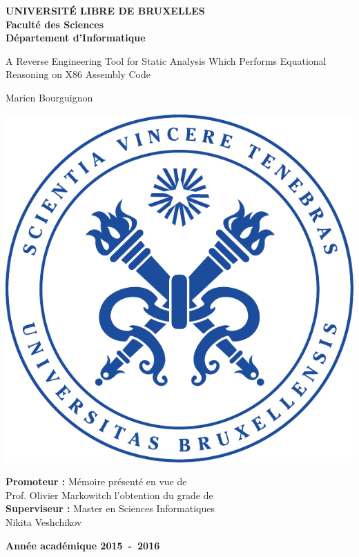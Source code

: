 \frontmatter
\begin{titlepage}
\begin{center}
	\textbf{UNIVERSIT\'E LIBRE DE BRUXELLES}\\
	\textbf{Facult\'e des Sciences}\\
	\textbf{D\'epartement d'Informatique}
	\vfill{}\vfill{}

	{\Huge   A Reverse Engineering Tool for Static Analysis Which Performs Equational Reasoning on X86 Assembly Code}

	{\Huge \par}
	\begin{center}{\LARGE Marien Bourguignon}\end{center}{\Huge \par}
	\vfill{}
	\includegraphics[keepaspectratio=true,scale=1]{ulb.pdf}
	\vfill{}
	\begin{flushright}
	{\large \textbf{Promoteur :}} \hfill{}{\large M\'emoire pr\'esent\'e en vue de}\\
	{\large Prof. Olivier Markowitch} \hfill{}{\large l'obtention du grade de}\\
	{\large \textbf{Superviseur :}} \hfill{}{\large Master en Sciences Informatiques}\\
	{\large Nikita Veshchikov} \hfill{}{\ }
	\end{flushright}{\large\par}
	\vfill{}\vfill{}\enlargethispage{3cm}
	\textbf{Ann\'ee acad\'emique 2015~-~2016}
\end{center}
\end{titlepage}
\newpage
\thispagestyle{empty} 
\null

\newenvironment{vcenterpage}
{\newpage\thispagestyle{empty}
\vspace*{\fill}}
{\vspace*{\fill}\par\pagebreak}
